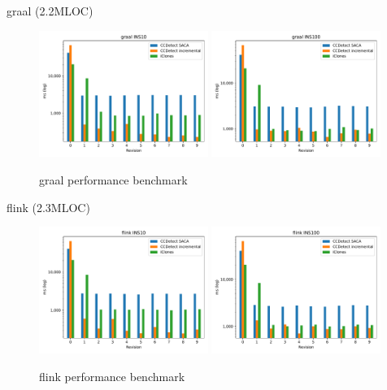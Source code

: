 \documentclass[aspectratio=1610, xcolor=table]{beamer}
\begin{document}
\begin{frame}{graal (2.2MLOC)}
    \begin{figure}[H]
    \begin{center}
        \includegraphics[width=0.49\textwidth]{figures/performancegraphs/graal_INS10.pdf}
        \includegraphics[width=0.49\textwidth]{figures/performancegraphs/graal_INS100.pdf}
    \end{center}
    \caption{graal performance benchmark}
    \label{fig:graal}
\end{figure}
\end{frame}

\begin{frame}{flink (2.3MLOC)}
    \begin{figure}[H]
    \begin{center}
        \includegraphics[width=0.49\textwidth]{figures/performancegraphs/flink_INS10.pdf}
        \includegraphics[width=0.49\textwidth]{figures/performancegraphs/flink_INS100.pdf}
    \end{center}
    \caption{flink performance benchmark}
    \label{fig:flink}
\end{figure}

\end{frame}
\end{document}

